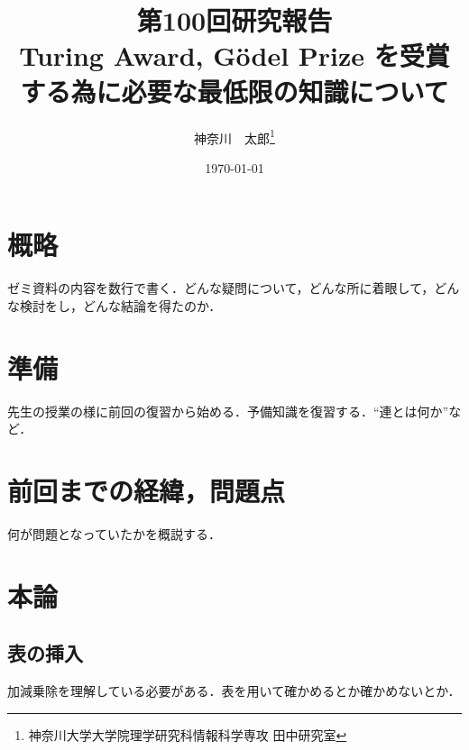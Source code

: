 \documentclass[10pt,twocolumn]{jarticle}
\title{第100回研究報告 \\ Turing Award, G\"{o}del Prize を受賞する為に必要な最低限の知識について}
\author{神奈川　太郎\if0\thanks{神奈川大学大学院理学研究科情報科学専攻 田中研究室}\fi}
\date{\today}
\begin{document}
\maketitle
\thispagestyle{empty}

%
%
%
%
%
%

% 

\section{概略}
\noindent ゼミ資料の内容を数行で書く．どんな疑問について，どんな所に着眼して，どんな検討をし，どんな結論を得たのか．

\section{準備}
\noindent 先生の授業の様に前回の復習から始める．予備知識を復習する．``連とは何か''など．

\section{前回までの経緯，問題点}
\noindent 何が問題となっていたかを概説する．

\section{本論}
\subsection{表の挿入}
加減乗除を理解している必要がある．表を用いて確かめるとか確かめないとか．
\end{document}
